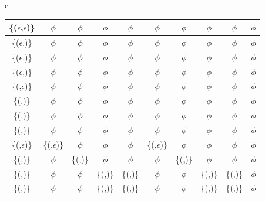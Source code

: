 \begin{figure*}
\begin{tabular}{c}
{\begin{tabular}{|c|c|c|c|c|c|c|c|c|c|}
\{($\epsilon$,$\epsilon$)\} & $\phi$ & $\phi$ & $\phi$ & $\phi$ & $\phi$ & $\phi$ & $\phi$ & $\phi$ & $\phi$\\ \hline

\{($\epsilon$,\fieldD{g}{})\} & $\phi$ & $\phi$ & $\phi$ & $\phi$ & $\phi$ & $\phi$ & $\phi$ & $\phi$ & $\phi$\\ \hline

\{($\epsilon$,\fieldI{g}{}{y})\} & $\phi$ & $\phi$ & $\phi$ & $\phi$ & $\phi$ & $\phi$ & $\phi$ & $\phi$ & $\phi$\\ \hline

\{($\epsilon$,\fieldI{g}{}{\infty})\} & $\phi$ & $\phi$ & $\phi$ & $\phi$ & $\phi$ & $\phi$ & $\phi$ & $\phi$ & $\phi$\\ \hline

\{(\fieldD{f}{},$\epsilon$)\} & $\phi$ & $\phi$ & $\phi$ & $\phi$ & $\phi$ & $\phi$ & $\phi$ & $\phi$ & $\phi$\\ \hline

\{(\fieldD{f}{},\fieldD{g}{})\} & $\phi$ & $\phi$ & $\phi$ & $\phi$ & $\phi$ & $\phi$ & $\phi$ & $\phi$ & $\phi$\\ \hline

\{(\fieldD{f}{},\fieldI{g}{}{y})\} & $\phi$ & $\phi$ & $\phi$ & $\phi$ & $\phi$ & $\phi$ & $\phi$ & $\phi$ & $\phi$ \\ \hline

\{(\fieldD{f}{},\fieldI{g}{}{\infty})\} & $\phi$ & $\phi$ & $\phi$ & $\phi$ & $\phi$ & $\phi$ & $\phi$ & $\phi$ & $\phi$\\ \hline

\{(\fieldI{f}{}{x},$\epsilon$)\} & \{(\fieldI{f}{}{x \star m},$\epsilon$)\} & $\phi$ & $\phi$ & $\phi$ & \{(\fieldI{f}{}{x},$\epsilon$)\} & $\phi$ & $\phi$ & $\phi$ & $\phi$\\ \hline

\{(\fieldI{f}{}{x},\fieldD{g}{})\} & $\phi$ & \{(\fieldI{f}{}{x \star m},\fieldD{g}{})\} & $\phi$ & $\phi$ & $\phi$ & \{(\fieldI{f}{}{x},\fieldD{g}{})\} & $\phi$ & $\phi$ & $\phi$\\ \hline

\{(\fieldI{f}{}{x},\fieldI{g}{}{y})\} & $\phi$ & $\phi$ & \{(\fieldI{f}{}{x \star m},\fieldI{g}{}{y \star n})\} & \{(\fieldI{f}{}{x \star m},\fieldI{g}{}{y})\} & $\phi$ & $\phi$ & \{(\fieldI{f}{}{x},\fieldI{g}{}{y \star n})\} & \{(\fieldI{f}{}{x},\fieldI{g}{}{y})\} & $\phi$\\ \hline

\{(\fieldI{f}{}{x},\fieldI{g}{}{\infty})\} & $\phi$ & $\phi$ & \{(\fieldI{f}{}{x \star m},\fieldI{g}{}{n})\} & \{(\fieldI{f}{}{x \star m},\fieldI{g}{}{\infty})\} & $\phi$ & $\phi$ & \{(\fieldI{f}{}{x},\fieldI{g}{}{n})\} & \{(\fieldI{f}{}{x},\fieldI{g}{}{n})\} & $\phi$\\ \hline


\end{tabular}}
\end{tabular}
\end{figure*}
